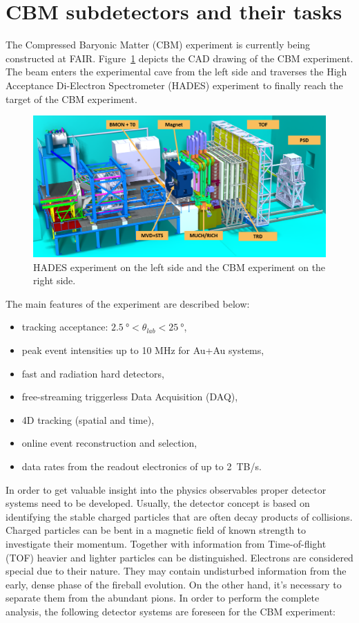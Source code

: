 

\section{CBM subdetectors and their tasks}
The Compressed Baryonic Matter (\gls{CBM}) experiment is currently being constructed at \gls{FAIR}. Figure~\ref{fig:exp} depicts the CAD drawing of the \gls{CBM} experiment. The beam enters the experimental cave from the left side and traverses the High Acceptance Di-Electron Spectrometer (\gls{HADES}) experiment to finally reach the target of the \gls{CBM} experiment. 

\begin{figure}[!h]
    \centering
    \includegraphics[width=1\columnwidth]{Chapter1/images/CBMnew.png}
    \caption{HADES experiment on the left side and the \gls{CBM} experiment on the right side.}
    \label{fig:exp}
\end{figure}

The main features of the experiment are described below:
\begin{itemize}
\item tracking acceptance: $\SI{2.5}{\degree} < \theta_{lab} < \SI{25}{\degree}$,
\item peak event intensities up to 10 MHz for Au+Au systems,
\item fast and radiation hard detectors,
\item free-streaming triggerless Data Acquisition (\gls{DAQ}),
\item 4D tracking (spatial and time),
\item online event reconstruction and selection,
\item data rates from the readout electronics of up to 2~TB/s.
\end{itemize}


In order to get valuable insight into the physics observables proper detector systems need to be developed. Usually, the detector concept is based on identifying the stable charged particles that are often decay products of collisions. Charged particles can be bent in a magnetic field of known strength to investigate their momentum. Together with information from Time-of-flight (\gls{TOF}) heavier and lighter particles can be distinguished. Electrons are considered special due to their nature. They may contain undisturbed information from the early, dense phase of the fireball evolution. On the other hand, it's necessary to separate them from the abundant pions. In order to perform the complete analysis, the following detector systems are foreseen for the \gls{CBM} experiment:\bigbreak


